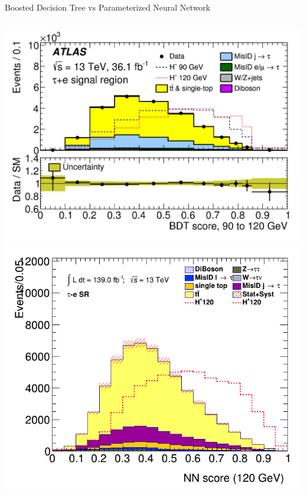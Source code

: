 \documentclass[aspectratio=169,xcolor=table]{beamer}
\begin{document}
      \begin{frame}[c]{Boosted Decision Tree vs Parameterized Neural Network}
        \begin{columns}[c]
          \includegraphics[height=.6\textheight,keepaspectratio=true]{tauel_SR_2018/tauel_SR_90to120_2018.png}
          \includegraphics[height=.6\textheight,keepaspectratio=true]{clf_score_GB200_mass_120to120_SR_TAUEL.png}
        \end{columns}
      \end{frame}
\end{document}
